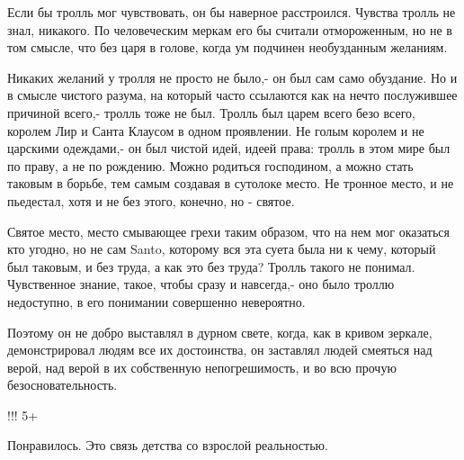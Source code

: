 Если бы тролль мог чувствовать, он бы наверное расстроился. Чувства тролль не
знал, никакого. По человеческим меркам его бы считали  отмороженным, но не в
том смысле, что без царя в голове, когда ум подчинен необузданным желаниям. 

Никаких желаний у тролля не просто не было,- он был сам само обуздание. Но и в
смысле чистого разума, на который часто ссылаются как на нечто послужившее
причиной всего,- тролль тоже не был.  Тролль был царем всего безо всего,
королем Лир и Санта Клаусом в одном проявлении. Не голым королем и не царскими
одеждами,- он был чистой идей, идеей права: тролль в этом мире был по праву, а
не по рождению. Можно родиться господином, а можно стать таковым в борьбе, тем
самым создавая в сутолоке место. Не тронное место, и не пьедестал, хотя и не
без этого, конечно, но - святое. 

Святое место, место смывающее грехи таким образом, что на нем мог оказаться кто
угодно, но не сам Santo, которому вся эта суета была ни к чему, который был
таковым, и без труда, а как это без труда?  Тролль такого не понимал.
Чувственное знание, такое, чтобы сразу и навсегда,- оно было троллю недоступно,
в его понимании совершенно невероятно. 

Поэтому он не добро выставлял в дурном свете, когда, как в кривом зеркале,
демонстрировал людям все их достоинства, он заставлял людей смеяться над верой,
над верой в их собственную непогрешимость, и во всю прочую безосновательность.

\begin{itemize} %
!!! 5+

Понравилось. Это связь детства со взрослой реальностью.
\end{itemize} %

